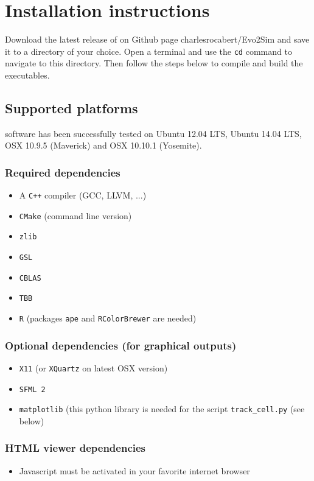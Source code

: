 \chapter{Installation instructions}

Download the latest release of {\packageName} on Github page charlesrocabert/Evo2Sim and save it to a directory of your choice. Open a terminal and use the \texttt{cd} command to navigate to this directory. Then follow the steps below to compile and build the executables.

\section{Supported platforms}
{\packageName} software has been successfully tested on Ubuntu 12.04 LTS, Ubuntu 14.04 LTS, OSX 10.9.5 (Maverick) and OSX 10.10.1 (Yosemite).

\subsection{Required dependencies}
\begin{itemize}
	\item A \texttt{C++} compiler (GCC, LLVM, ...)
	\item \texttt{CMake} (command line version)
	\item \texttt{zlib}
	\item \texttt{GSL}
	\item \texttt{CBLAS}
	\item \texttt{TBB}
	\item \texttt{R} (packages \texttt{ape} and \texttt{RColorBrewer} are needed)
\end{itemize}

\subsection{Optional dependencies (for graphical outputs)}
\begin{itemize}
	\item \texttt{X11} (or \texttt{XQuartz} on latest OSX version)
	\item \texttt{SFML 2}
	\item \texttt{matplotlib} (this python library is needed for the script \texttt{track\_cell.py} (see below)
\end{itemize}

\subsection{HTML viewer dependencies}
\begin{itemize}
	\item Javascript must be activated in your favorite internet browser
\end{itemize}

